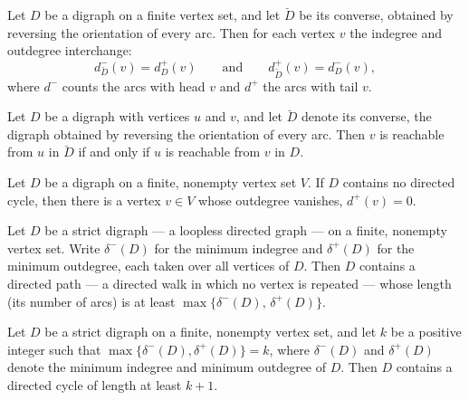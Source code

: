 \begin{theorem}
\label{converse_indegree}
\leanok
{}
Let $D$ be a digraph on a finite vertex set, and let $\breve{D}$ be its converse,
obtained by reversing the orientation of every arc. Then for each vertex $v$ the
indegree and outdegree interchange:
\[
d^{-}_{\breve{D}}(v) = d^{+}_{D}(v)
\qquad\text{and}\qquad
d^{+}_{\breve{D}}(v) = d^{-}_{D}(v),
\]
where $d^{-}$ counts the arcs with head $v$ and $d^{+}$ the arcs with tail $v$.
\end{theorem}

\begin{theorem}
\label{converse_reachable}
\leanok
{}
Let $D$ be a digraph with vertices $u$ and $v$, and let $\breve{D}$ denote its converse,
the digraph obtained by reversing the orientation of every arc. Then $v$ is reachable
from $u$ in $\breve{D}$ if and only if $u$ is reachable from $v$ in $D$.
\end{theorem}

\begin{theorem}
\label{exists_outdegree_zero_of_acyclic}
\leanok
{}
Let $D$ be a digraph on a finite, nonempty vertex set $V$. If $D$ contains no directed
cycle, then there is a vertex $v \in V$ whose outdegree vanishes, $d^{+}(v) = 0$.
\end{theorem}

\begin{theorem}
\label{exists_directedPath_length_ge_maxMinDegree}
\leanok
{}
Let $D$ be a strict digraph — a loopless directed graph — on a finite, nonempty vertex
set. Write $\delta^-(D)$ for the minimum indegree and $\delta^+(D)$ for the minimum
outdegree, each taken over all vertices of $D$. Then $D$ contains a directed path — a
directed walk in which no vertex is repeated — whose length (its number of arcs) is at
least $\max\{\delta^-(D),\,\delta^+(D)\}$.
\end{theorem}

\begin{theorem}
\label{exists_directedCycle_length_ge}
\leanok
{}
Let $D$ be a strict digraph on a finite, nonempty vertex set, and let $k$ be a positive
integer such that $\max\{\delta^{-}(D),\delta^{+}(D)\}=k$, where $\delta^{-}(D)$ and
$\delta^{+}(D)$ denote the minimum indegree and minimum outdegree of $D$. Then $D$
contains a directed cycle of length at least $k+1$.
\end{theorem}

